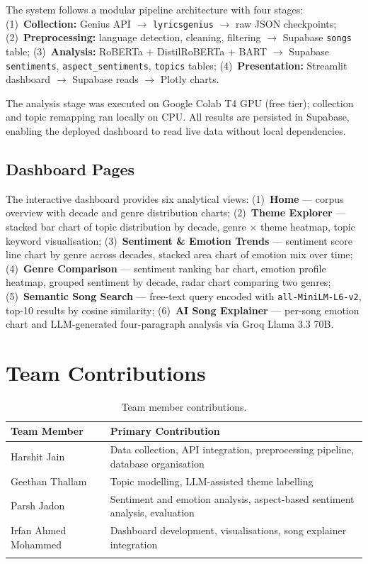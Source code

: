\documentclass[pdflatex,sn-mathphys-num]{sn-jnl}
\begin{document}
The system follows a modular pipeline architecture with four stages: (1)~\textbf{Collection:} Genius API $\to$ \texttt{lyricsgenius} $\to$ raw JSON checkpoints; (2)~\textbf{Preprocessing:} language detection, cleaning, filtering $\to$ Supabase \texttt{songs} table; (3)~\textbf{Analysis:} RoBERTa + DistilRoBERTa + BART $\to$ Supabase \texttt{sentiments}, \texttt{aspect\_sentiments}, \texttt{topics} tables; (4)~\textbf{Presentation:} Streamlit dashboard $\to$ Supabase reads $\to$ Plotly charts.

The analysis stage was executed on Google Colab T4 GPU (free tier); collection and topic remapping ran locally on CPU. All results are persisted in Supabase, enabling the deployed dashboard to read live data without local dependencies.

\subsection{Dashboard Pages}\label{subsec17}

The interactive dashboard provides six analytical views: (1)~\textbf{Home} --- corpus overview with decade and genre distribution charts; (2)~\textbf{Theme Explorer} --- stacked bar chart of topic distribution by decade, genre $\times$ theme heatmap, topic keyword visualisation; (3)~\textbf{Sentiment \& Emotion Trends} --- sentiment score line chart by genre across decades, stacked area chart of emotion mix over time; (4)~\textbf{Genre Comparison} --- sentiment ranking bar chart, emotion profile heatmap, grouped sentiment by decade, radar chart comparing two genres; (5)~\textbf{Semantic Song Search} --- free-text query encoded with \texttt{all-MiniLM-L6-v2}, top-10 results by cosine similarity; (6)~\textbf{AI Song Explainer} --- per-song emotion chart and LLM-generated four-paragraph analysis via Groq Llama 3.3 70B.

\section{Team Contributions}\label{sec8}

\begin{table}[h]
\caption{Team member contributions.}\label{tab:team}
\begin{tabular}{@{}p{4cm}p{9cm}@{}}
\toprule
\textbf{Team Member} & \textbf{Primary Contribution} \\
\midrule
Harshit Jain         & Data collection, API integration, preprocessing pipeline, database organisation \\
Geethan Thallam      & Topic modelling, LLM-assisted theme labelling \\
Parsh Jadon          & Sentiment and emotion analysis, aspect-based sentiment analysis, evaluation \\
Irfan Ahmed Mohammed & Dashboard development, visualisations, song explainer integration \\
\botrule
\end{tabular}
\end{table}
\end{document}
